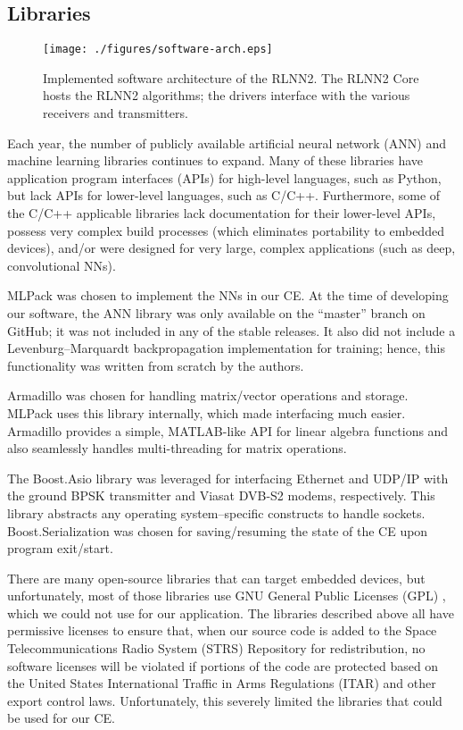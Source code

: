 \documentclass[journal]{IEEEtran}
\let\MYoriglatexcaption\caption
\renewcommand{\caption}[2][\relax]{\MYoriglatexcaption[#2]{#2}}
\begin{document}
\subsection{Libraries} \label{sec:softwarelibraries}
\begin{figure*}[t]
\centering
 \texttt{[image: ./figures/software-arch.eps]}
 \caption{Implemented software architecture of the RLNN2.  The RLNN2 Core hosts the RLNN2 algorithms; the drivers interface with the various receivers and transmitters.}
 \label{fig:soft-arch}
\end{figure*}

Each year, the number of publicly available artificial neural network (ANN) and machine learning libraries continues to expand.  Many of these libraries have application program interfaces (APIs) for high-level languages, such as Python, but lack APIs for lower-level languages, such as C/C++.  Furthermore, some of the C/C++ applicable libraries lack documentation for their lower-level APIs, possess very complex build processes \cite{caffe-documentation} (which eliminates portability to embedded devices), and/or were designed for very large, complex applications \cite{darknet-documentation} (such as deep, convolutional NNs).

MLPack \cite{mlpack-documentation} was chosen to implement the NNs in our CE.  At the time of developing our software, the ANN library was only available on the ``master'' branch on GitHub; it was not included in any of the stable releases.  It also did not include a Levenburg--Marquardt backpropagation implementation for training; hence, this functionality was written from scratch by the authors.

Armadillo \cite{armadillo-documentation} was chosen for handling matrix/vector operations and storage.  MLPack uses this library internally, which made interfacing much easier.  Armadillo provides a simple, MATLAB-like API for linear algebra functions and also seamlessly handles multi-threading for matrix operations.

The Boost.Asio \cite{boost-asio-library} library was leveraged for interfacing Ethernet and UDP/IP with the ground BPSK transmitter and Viasat DVB-S2 modems, respectively.  This library abstracts any operating system--specific constructs to handle sockets.  Boost.Serialization \cite{boost-serialization-library} was chosen for saving/resuming the state of the CE upon program exit/start.

There are many open-source libraries that can target embedded devices, but unfortunately, most of those libraries use GNU General Public Licenses (GPL) \cite{GPL-license}, which we could not use for our application.  The libraries described above all have permissive licenses \cite{bsd-license} to ensure that, when our source code is added to the Space Telecommunications Radio System (STRS) Repository \cite{strs-repo} for redistribution, no software licenses will be violated if portions of the code are protected based on the United States International Traffic in Arms Regulations (ITAR) and other export control laws.  Unfortunately, this severely limited the libraries that could be used for our CE.
\end{document}

